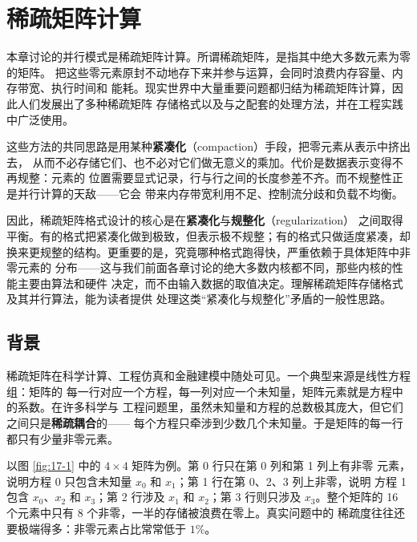 \chapter{稀疏矩阵计算}
\label{chap:sparse-matrix}

\setcounter{footnote}{0}

本章讨论的并行模式是稀疏矩阵计算。所谓稀疏矩阵，是指其中绝大多数元素为零的矩阵。
把这些零元素原封不动地存下来并参与运算，会同时浪费内存容量、内存带宽、执行时间和
能耗。现实世界中大量重要问题都归结为稀疏矩阵计算，因此人们发展出了多种稀疏矩阵
存储格式以及与之配套的处理方法，并在工程实践中广泛使用。

这些方法的共同思路是用某种\textbf{紧凑化}（compaction）手段，把零元素从表示中挤出去，
从而不必存储它们、也不必对它们做无意义的乘加。代价是数据表示变得不再规整：元素的
位置需要显式记录，行与行之间的长度参差不齐。而不规整性正是并行计算的天敌——它会
带来内存带宽利用不足、控制流分歧和负载不均衡。

因此，稀疏矩阵格式设计的核心是在\textbf{紧凑化}与\textbf{规整化}（regularization）
之间取得平衡。有的格式把紧凑化做到极致，但表示极不规整；有的格式只做适度紧凑，却
换来更规整的结构。更重要的是，究竟哪种格式跑得快，严重依赖于具体矩阵中非零元素的
分布——这与我们前面各章讨论的绝大多数内核都不同，那些内核的性能主要由算法和硬件
决定，而不由输入数据的取值决定。理解稀疏矩阵存储格式及其并行算法，能为读者提供
处理这类“紧凑化与规整化”矛盾的一般性思路。

\section{背景}
\label{sec:spmv-background}

稀疏矩阵在科学计算、工程仿真和金融建模中随处可见。一个典型来源是线性方程组：矩阵的
每一行对应一个方程，每一列对应一个未知量，矩阵元素就是方程中的系数。在许多科学与
工程问题里，虽然未知量和方程的总数极其庞大，但它们之间只是\textbf{稀疏耦合}的——
每个方程只牵涉到少数几个未知量。于是矩阵的每一行都只有少量非零元素。

以图 \ref{fig:17-1} 中的 $4\times 4$ 矩阵为例。第 0 行只在第 0 列和第 1 列上有非零
元素，说明方程 0 只包含未知量 $x_0$ 和 $x_1$；第 1 行在第 0、2、3 列上非零，说明
方程 1 包含 $x_0$、$x_2$ 和 $x_3$；第 2 行涉及 $x_1$ 和 $x_2$；第 3 行则只涉及
$x_3$。整个矩阵的 16 个元素中只有 8 个非零，一半的存储被浪费在零上。真实问题中的
稀疏度往往还要极端得多：非零元素占比常常低于 $1\%$。

